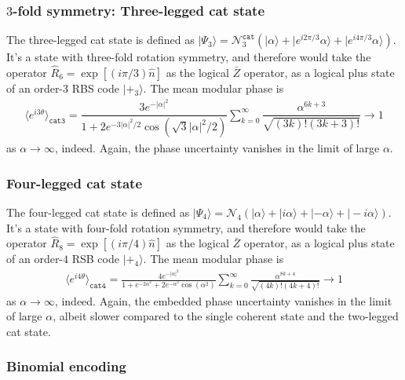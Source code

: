 \documentclass{article}
\begin{document}
\subsubsection{$3$-fold symmetry: Three-legged cat state}

The three-legged cat state is defined as $|\Psi_3\rangle =\mathcal{N}^\texttt{cat}_3(|\alpha\rangle+|e^{i2\pi/3}\alpha\rangle+|e^{i4\pi/3}\alpha\rangle)$. It's a state with three-fold rotation symmetry, and therefore would take the operator $\hat{R}_{6}=\exp[(i\pi/3)\hat{n}]$ as the logical $\bar{Z}$ operator, as a logical plus state of an order-3 RBS code $|+_3\rangle$. The mean modular phase is 
\begin{align}
    \langle e^{i3\theta}\rangle_{\texttt{cat3}} =\dfrac{3e^{-|\alpha|^2}}{1+2e^{-3|\alpha|^2/2}\cos\left(\sqrt{3}|\alpha|^2/2\right)}\sum_{k=0}^\infty \dfrac{\alpha^{6k+3}}{\sqrt{(3k)!(3k+3)!}}\to 1    
\end{align}
as $\alpha\to\infty$, indeed. Again, the phase uncertainty vanishes in the limit of large $\alpha$. 
\subsubsection{Four-legged cat state}

The four-legged cat state is defined as $|\Psi_4\rangle=\mathcal{N}_4(|\alpha\rangle+|i\alpha\rangle+|-\alpha\rangle+|-i\alpha\rangle)$. It's a state with four-fold rotation symmetry, and therefore would take the operator $\hat{R}_8=\exp[(i\pi/4)\hat{n}]$ as the logical $\bar{Z}$ operator, as a logical plus state of an order-$4$ RSB code $|+_4\rangle$. The mean modular phase is
\begin{align}
    \langle e^{i4\theta}\rangle_{\texttt{cat4}} =\frac{4e^{-|\alpha|^2}}{1+e^{-2\alpha^2}+2e^{-\alpha^2}\cos(\alpha^2)}\sum_{k=0}^\infty\frac{\alpha^{8k+4}}{\sqrt{(4k)!(4k+4)!}}\to 1
\end{align}
as $\alpha\to\infty$, indeed. Again, the embedded phase uncertainty vanishes in the limit of large $\alpha$, albeit slower compared to the single coherent state and the two-legged cat state. 

\subsubsection{Binomial encoding}
\end{document}
